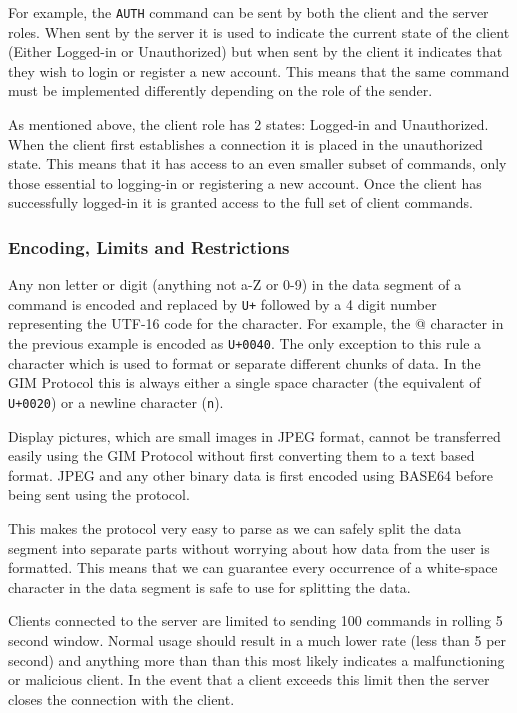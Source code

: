 For example, the \texttt{AUTH} command can be sent by both the client and the server roles. When sent by the server it is used to indicate the current state of the client (Either Logged-in or Unauthorized) but when sent by the client it indicates that they wish to login or register a new account. This means that the same command must be implemented differently depending on the role of the sender.

As mentioned above, the client role has 2 states: Logged-in and Unauthorized. When the client first establishes a connection it is placed in the unauthorized state. This means that it has access to an even smaller subset of commands, only those essential to logging-in or registering a new account. Once the client has successfully logged-in it is granted access to the full set of client commands.


\subsubsection{Encoding, Limits and Restrictions}

Any non letter or digit (anything not a-Z or 0-9) in the data segment of a command is encoded and replaced by \texttt{\SLASH U+} followed by a 4 digit number representing the UTF-16 code for the character. For example, the @ character in the previous example is encoded as \texttt{\SLASH U+0040}. The only exception to this rule a character which is used to format or separate different chunks of data. In the GIM Protocol this is always either a single space character (the equivalent of \texttt{\SLASH U+0020}) or a newline character (\texttt{\SLASH n}).

Display pictures, which are small images in JPEG format, cannot be transferred easily using the GIM Protocol without first converting them to a text based format. JPEG and any other binary data is first encoded using BASE64 before being sent using the protocol.

This makes the protocol very easy to parse as we can safely split the data segment into separate parts without worrying about how data from the user is formatted. This means that we can guarantee every occurrence of a white-space character in the data segment is safe to use for splitting the data.

Clients connected to the server are limited to sending 100 commands in rolling 5 second window. Normal usage should result in a much lower rate (less than 5 per second) and anything more than than this most likely indicates a malfunctioning or malicious client. In the event that a client exceeds this limit then the server closes the connection with the client.

